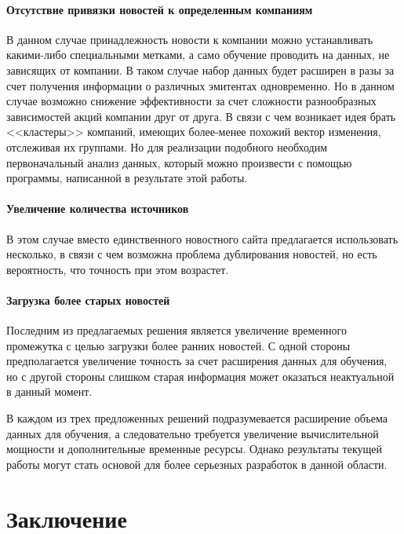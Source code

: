 \documentclass[14pt]{matmex-diploma-custom}
\begin{document}
\paragraph{Отсутствие привязки новостей к определенным компаниям} В данном случае принадлежность новости к компании можно устанавливать какими-либо специальными метками, а само обучение проводить на данных, не зависящих от компании. В таком случае набор данных будет расширен в разы за счет получения информации о различных эмитентах одновременно. Но в данном случае возможно снижение эффективности за счет сложности разнообразных зависимостей акций компании друг от друга. В связи с чем возникает идея брать <<кластеры>> компаний, имеющих более-менее похожий вектор изменения, отслеживая их группами. Но для реализации подобного необходим первоначальный анализ данных, который можно произвести с помощью программы, написанной в результате этой работы.

\paragraph{Увеличение количества источников} В этом случае вместо единственного новостного сайта предлагается использовать несколько, в связи с чем возможна проблема дублирования новостей, но есть вероятность, что точность при этом возрастет.

\paragraph{Загрузка более старых новостей} Последним из предлагаемых решения является увеличение временного промежутка с целью загрузки более ранних новостей. С одной стороны предполагается увеличение точность за счет расширения данных для обучения, но с другой стороны слишком старая информация может оказаться неактуальной в данный момент.

\vspace{5mm}

В каждом из трех предложенных решений подразумевается расширение объема данных для обучения, а следовательно требуется увеличение вычислительной мощности и дополнительные временные ресурсы. Однако результаты текущей работы могут стать основой для более серьезных разработок в данной области.

\clearpage\section*{Заключение}
\end{document}
